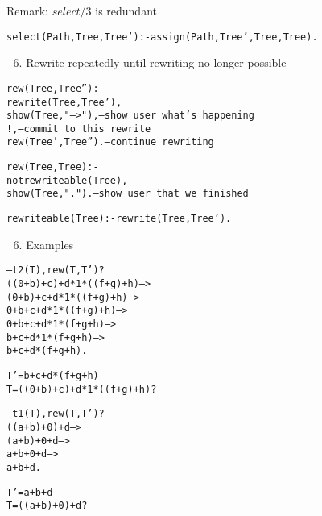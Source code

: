 \documentclass{popl}
\newenvironment{smalltt}{\begin{alltt}\smaller}{\end{alltt}}
\newcommand{\rmbox}[1]{\mbox{{\rm #1}}}
\begin{document}
\begin{foil} 
\begin{cframed}
        Remark: $select/3$ is redundant
\end{cframed}

\begin{smalltt}
   select(Path, Tree, Tree') :- assign(Path, Tree', Tree, Tree).
\end{smalltt}

\end{foil}



\begin{foil} 

6. Rewrite repeatedly until rewriting no longer possible
\begin{smalltt}
    rew(Tree, Tree'') :- 
       rewrite(Tree,   Tree'),
       show(Tree, "-->"),        -- \rmbox{show user what's happening}
       !,                        -- \rmbox{commit to this rewrite}
       rew(Tree', Tree'').       -- \rmbox{continue rewriting}
                          
    rew(Tree, Tree)   :- 
       not rewriteable(Tree), 
       show(Tree, ".").          -- \rmbox{show user that we finished}

    rewriteable(Tree) :- rewrite(Tree, Tree').
\end{smalltt}

6. Examples
\begin{smalltt}
    -- t2(T), rew(T, T')?
    ((0 + b) + c) + d * 1 * ((f + g) + h) -->
    (0 + b) + c + d * 1 * ((f + g) + h) -->
    0 + b + c + d * 1 * ((f + g) + h) -->
    0 + b + c + d * 1 * (f + g + h) -->
    b + c + d * 1 * (f + g + h) -->
    b + c + d * (f + g + h) .
    
    T' = b + c + d * (f + g + h) 
    T  = ((0 + b) + c) + d * 1 * ((f + g) + h) ? 

    -- t1(T), rew(T, T')?
    ((a + b) + 0) + d -->
    (a + b) + 0 + d -->
    a + b + 0 + d -->
    a + b + d .
    
    T' = a + b + d 
    T = ((a + b) + 0) + d ? 
\end{smalltt}
\end{foil}
\end{document}
